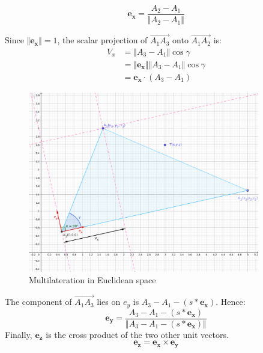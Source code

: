 \documentclass[\main/thesis.tex]{subfiles}
\begin{document}
\begin{equation}
    \boldsymbol{e_x} = \frac{A_2-A_1}{\Vert A_2 - A_1\Vert}
    \label{eqn:multilateration_ex}
\end{equation}

Since $\Vert \boldsymbol{e_x} \Vert = 1$, the scalar projection of $\overrightarrow{A_1A_3}$ onto $\overrightarrow{A_1A_2}$ is:
\begin{equation}
    \begin{split}
    V_x &= \Vert A_3 - A_1 \Vert \cos{\gamma} \\
    &= \Vert \boldsymbol{e_x} \Vert \Vert A_3 - A_1 \Vert \cos{\gamma}\\
    &= \boldsymbol{e_x} \cdot (A_3 - A_1)      
    \end{split}
\end{equation}

\begin{figure}[H]
    \centering
    \includegraphics[width=0.9\textwidth]{multilateration.png}
    \caption{Multilateration in Euclidean space}
    \label{fig:multilateration}
\end{figure}

The component of $\overrightarrow{A_1A_3}$ lies on $e_y$ is $A_3-A_1-(s*\boldsymbol{e_x})$. Hence:
\begin{equation}
    \boldsymbol{e_y} = \frac{A_3-A_1-(s*\boldsymbol{e_x})}{\Vert A_3-A_1-(s*\boldsymbol{e_x})\Vert}
\end{equation}
Finally, $\boldsymbol{e_z}$ is the cross product of the two other unit vectors.
\begin{equation}
    \boldsymbol{e_z} = \boldsymbol{e_x} \times \boldsymbol{e_y}
\end{equation}
\end{document}
